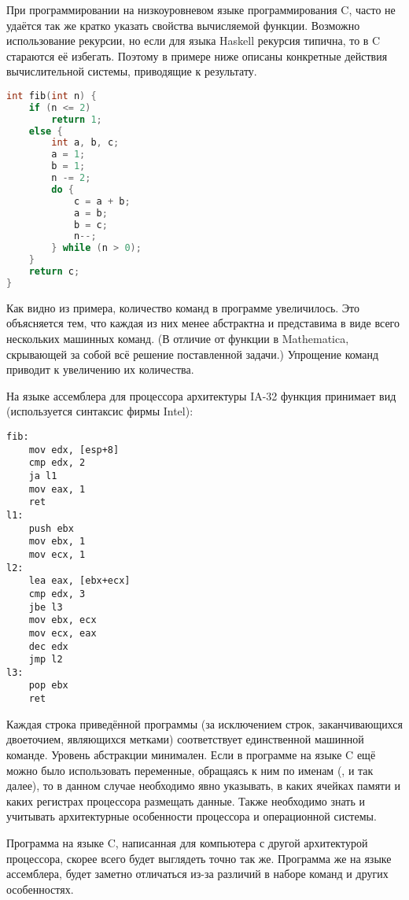 
При программировании на низкоуровневом языке программирования C, часто
не удаётся так же кратко указать свойства вычисляемой функции.
Возможно использование рекурсии, но если для языка Haskell рекурсия
типична, то в C стараются её избегать. Поэтому в примере ниже описаны
конкретные действия вычислительной системы, приводящие к результату.

\begin{lstlisting}[language=C]
int fib(int n) {
    if (n <= 2)
        return 1;
    else {
        int a, b, c;
        a = 1;
        b = 1;
        n -= 2;
        do {
            c = a + b;
            a = b;
            b = c;
            n--;
        } while (n > 0);
    }
    return c;
}
\end{lstlisting}

Как видно из примера, количество команд в программе увеличилось. Это
объясняется тем, что каждая из них менее абстрактна и представима в
виде всего нескольких машинных команд. (В отличие от функции
 в Mathematica, скрывающей за собой всё решение
поставленной задачи.) Упрощение команд приводит к увеличению их
количества.


На языке ассемблера для процессора архитектуры IA-32 функция принимает
вид (используется синтаксис фирмы Intel):

\begin{lstlisting}[language={[x86masm]Assembler}]
fib:
    mov edx, [esp+8]
    cmp edx, 2
    ja l1
    mov eax, 1
    ret
l1:
    push ebx
    mov ebx, 1
    mov ecx, 1
l2:
    lea eax, [ebx+ecx]
    cmp edx, 3
    jbe l3
    mov ebx, ecx
    mov ecx, eax
    dec edx
    jmp l2
l3:
    pop ebx
    ret
\end{lstlisting}

Каждая строка приведённой программы (за исключением строк,
заканчивающихся двоеточием, являющихся метками) соответствует
единственной машинной команде. Уровень абстракции минимален. Если в
программе на языке C ещё можно было использовать переменные, обращаясь
к ним по именам (,  и так далее), то в данном случае
необходимо явно указывать, в каких ячейках памяти и каких регистрах
процессора размещать данные. Также необходимо знать и учитывать
архитектурные особенности процессора и операционной системы.

Программа на языке C, написанная для компьютера с другой архитектурой
процессора, скорее всего будет выглядеть точно так же. Программа же на
языке ассемблера, будет заметно отличаться из-за различий в наборе
команд и других особенностях.

